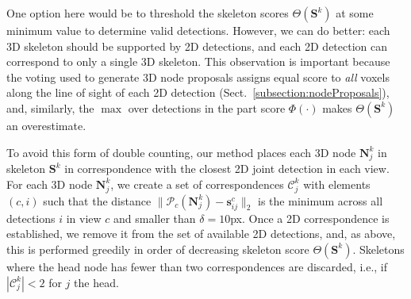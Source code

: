 One option here would be to threshold the skeleton scores $\Theta(\mathbf{S}^k)$ at some minimum value to determine valid detections. However, we can do better: each 3D skeleton  should be supported by 2D detections, and each 2D detection can correspond to only a single 3D skeleton. This observation is important because the voting used to generate 3D node proposals assigns equal score to {\em all} voxels along the line of sight of each 2D detection (Sect.~\ref{subsection:nodeProposals}), and, similarly, the $\max$ over detections in the part score $\Phi(\cdot)$ makes  $\Theta(\mathbf{S}^k)$ an overestimate. 

To avoid this form of double counting, our method places each 3D node $\mathbf{N}^{k}_{j}$ in skeleton $\mathbf{S}^k$ in correspondence with the closest 2D joint detection in each view. For each 3D node $\mathbf{N}^{k}_{j}$, we create a set of correspondences $\mathcal{C}_j^k$ with elements $(c,i)$ such that the distance $\| \mathcal{P}_c(\mathbf{N}_j^k) - \mathbf{s}_{ij}^c \|_2$ is the minimum across all detections $i$ in view $c$ and smaller than $\delta{=}10$px. 
Once a 2D correspondence is established, we remove it from the set of available 2D detections, and, as above, this is performed greedily in order of decreasing skeleton score $\Theta(\mathbf{S}^k)$. Skeletons where the head node has fewer than two correspondences are discarded, i.e., if $|\mathcal{C}_{j}^k|<2$ for $j$ the head.

